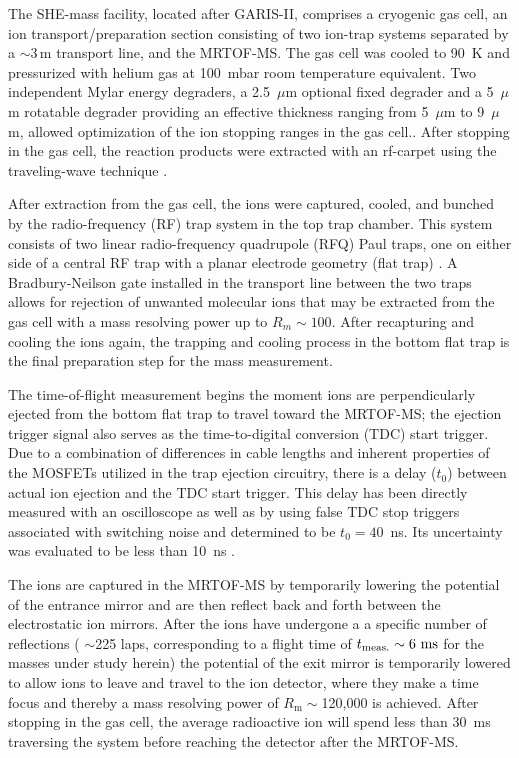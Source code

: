 \documentclass[3p]{elsarticle}
\begin{document}
The SHE-mass facility, located after GARIS-II, comprises a cryogenic gas cell, an ion transport/preparation section consisting of two ion-trap systems separated by a $\sim 3\,\mathrm{m}$ transport line, and the MRTOF-MS. The gas cell was cooled to 90~K and pressurized with helium gas at 100~mbar room temperature equivalent. Two independent Mylar energy degraders, a 2.5~$\mu$m optional fixed degrader and a 5~$\mu$m rotatable degrader providing an effective thickness ranging from 5~$\mu$m to 9~$\mu$m, allowed optimization of the ion stopping ranges in the gas cell.. After stopping in the gas cell, the reaction products were extracted with an rf-carpet using the traveling-wave technique \cite{Arai2014}.

After extraction from the gas cell, the ions were captured, cooled, and bunched by the radio-frequency (RF) trap system in the top trap chamber.  This system consists of two linear radio-frequency quadrupole (RFQ) Paul traps, one on either side of a central RF trap with a planar electrode geometry (flat trap) \cite{Schury2009}. A Bradbury-Neilson gate \cite{Brunner2012} installed in the transport line between the two traps allows for rejection of unwanted molecular ions that may be extracted from the gas cell with a mass resolving power up to $R_m \sim 100$. After recapturing and cooling the ions again, the trapping and cooling process in the bottom flat trap is the final preparation step for the mass measurement.

The time-of-flight measurement begins the moment ions are perpendicularly ejected from the bottom flat trap to travel toward the MRTOF-MS; the ejection trigger signal also serves as the time-to-digital conversion (TDC) start trigger.  Due to a combination of differences in cable lengths and inherent properties of the MOSFETs utilized in the trap ejection circuitry, there is a delay ($t_0$) between actual ion ejection and the TDC start trigger.  This delay has been directly measured with an oscilloscope as well as by using false TDC stop triggers associated with switching noise and determined to be $t_0=40 $~ns. Its uncertainty was evaluated to be less than 10~ns \citep{Schury2017}. 

The ions are captured in the MRTOF-MS by temporarily lowering the potential of the entrance mirror and are then reflect back and forth between the electrostatic ion mirrors.  After the ions have undergone a a specific number of reflections ( $\sim$225 laps, corresponding to a flight time of $t_{\rm meas.}\sim 6 \ {\rm ms}$ for the masses under study herein) the potential of the exit mirror is temporarily lowered to allow ions to leave and travel to the ion detector, where they make a time focus and thereby a mass resolving power of  $R_\mathrm{m}\sim$120,000 is achieved.  After stopping in the gas cell, the average radioactive ion will spend less than 30~ms traversing the system before reaching the detector after the MRTOF-MS.
\end{document}
